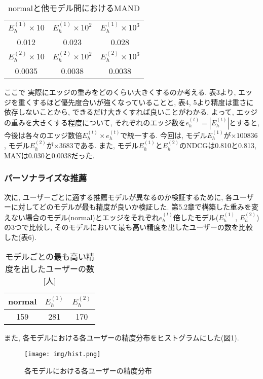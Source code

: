 \documentclass[a4j,11pt]{jarticle}           %
\begin{document}
	
	\begin{table}[htbp]
		\centering
		\caption{normalと他モデル間におけるMAND}
		\begin{tabular}{ccc}\hline
			$E_h^{(1)}\times10$&$E_h^{(1)}\times10^2$&$E_h^{(1)}\times10^3$ \\ 
			0.012&0.023 &0.028 \\ \hline
			$E_h^{(2)}\times10$&$E_h^{(2)}\times10^2$&$E_h^{(2)}\times10^3$\\ 
			0.0035&0.0038 &0.0038\\ \hline
		\end{tabular}
	\end{table}
	ここで 実際にエッジの重みをどのくらい大きくするのか考える. 表3より, エッジを重くするほど優先度合いが強くなっていることと, 表4, 5より精度は重さに依存しないことから, 
	できるだけ大きくすれば良いことがわかる. よって, エッジの重みを大きくする程度について, それぞれのエッジ数を$e_h^{(t)} = |E_h^{(t)}|$とすると, 今後は各々のエッジ数倍$E_h^{(t)}\times e_h^{(t)}$で統一する. 今回は, モデル$E_h^{(1)}$が$\times100836$, モデル$E_h^{(2)}$が$\times3683$である. また, モデル$E_h^{(1)}$と$E_h^{(2)}$のNDCGは0.810と0.813, MANは0.030と0.0038だった.
	\subsubsection{パーソナライズな推薦}
	次に, ユーザーごとに適する推薦モデルが異なるのか検証するために, 各ユーザーに対してどのモデルが最も精度が良いか検証した. 第5.2章で構築した重みを変えない場合のモデル(normal)とエッジをそれぞれ$e_h^{(t)}$倍したモデル($E_h^{(1)}$, $E_h^{(2)}$)の3つで比較し, そのモデルにおいて最も高い精度を出したユーザーの数を比較した(表6). 
	\begin{table}[h]
		\centering
		\caption{モデルごとの最も高い精度を出したユーザーの数[人]}
		\begin{tabular}{ccc}\hline
			normal&$E_h^{(1)}$&$E_h^{(2)}$ \\ \hline
			159 & 281 &170 \\ \hline
		\end{tabular}
	\end{table}
	
	
	また, 各モデルにおける各ユーザーの精度分布をヒストグラムにした(図1). 
	
	\begin{figure}[H]
		\centering
		\texttt{[image: img/hist.png]}
		\caption{各モデルにおける各ユーザーの精度分布}
	\end{figure}
	
\end{document}
